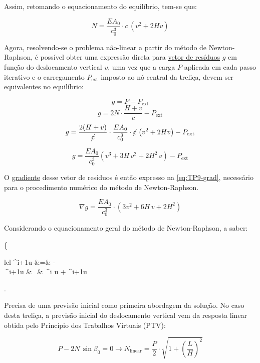 \begin{textocaixa}
Assim, retomando o equacionamento do equilíbrio, tem-se que:

\begin{equation}
	N = \frac{EA_0}{c_0^3}\cdot c\,\left(v^2 + 2Hv\right)
	\label{eq:TP9-const}
\end{equation}

Agora, resolvendo-se o problema não-linear a partir do método de Newton-Raphson, é possível
obter uma expressão direta para \underline{vetor de resíduos} $g$ em função do deslocamento
vertical $v$, uma vez que a carga $P$ aplicada em cada passo iterativo e o carregamento
$P_\text{ext}$ imposto ao nó central da treliça, devem ser equivalentes no equilíbrio:

$$g = P - P_\text{ext}$$
$$g = 2N\cdot\frac{H + v}{c} - P_\text{ext}$$
$$g = \frac{2(H + v)}{\cancel{c}}\cdot \frac{EA_0}{c_0^3}\cdot
                      \cancel{c}\,\left(v^2 + 2Hv\right)
	- P_\text{ext}$$

\begin{equation}
	\boxed{g = \frac{EA_0}{c_0^3}\left(v^3 + 3H\,v^2 + 2H^2\,v\right) - P_\text{ext}}
	\label{eq:TP9-residuo}
\end{equation}

O \underline{gradiente} desse vetor de resíduos é então expresso na \autoref{eq:TP9-grad},
necessário para o procedimento numérico do método de Newton-Raphson.

\begin{equation}
	\boxed{\nabla g = \frac{EA_0}{c_0^3}\cdot \left(3v^2 + 6H\,v + 2H^2\right)}
	\label{eq:TP9-grad}
\end{equation}

Considerando o equacionamento geral do método de Newton-Raphson, a saber:

\begin{bigEquation}
	\left\{\begin{array}{lcl}
		\Delta^{i+1}u &=& - \\ [10pt]
		\,^{i+1}u &=& \,^i u + \Delta^{i+1}u \\ [10pt]
	\end{array}\right.
	\label{eq:Newton-Raphson}
\end{bigEquation}

Precisa de uma previsão inicial como primeira abordagem da solução. No caso desta treliça,
a previsão inicial do deslocamento vertical vem da resposta linear obtida pelo Princípio dos
Trabalhos Virtuais (PTV):

$$P - 2N\,\sin\beta_0 = 0
\longrightarrow N_\text{linear}
= \frac{P}{2}\cdot\sqrt{1 + \left(\frac{L}{H}\right)^2}$$


\end{textocaixa}
